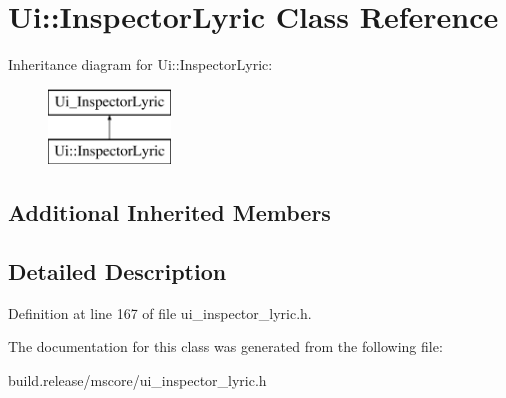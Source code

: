 \hypertarget{class_ui_1_1_inspector_lyric}{}\section{Ui\+:\+:Inspector\+Lyric Class Reference}
\label{class_ui_1_1_inspector_lyric}
Inheritance diagram for Ui\+:\+:Inspector\+Lyric\+:\begin{figure}[H]
\begin{center}
\leavevmode
\includegraphics[height=2.000000cm]{class_ui_1_1_inspector_lyric}
\end{center}
\end{figure}
\subsection*{Additional Inherited Members}


\subsection{Detailed Description}


Definition at line 167 of file ui\+\_\+inspector\+\_\+lyric.\+h.



The documentation for this class was generated from the following file\+:\begin{DoxyCompactItemize}
\item 
build.\+release/mscore/ui\+\_\+inspector\+\_\+lyric.\+h\end{DoxyCompactItemize}
